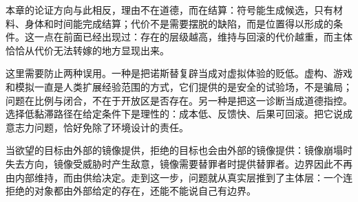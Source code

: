 本章的论证方向与此相反，理由不在道德，而在结算：符号能生成候选，只有材料、身体和时间能完成结算；代价不是需要摆脱的缺陷，而是位置得以形成的条件。这一点在前面已经出现过：存在的层级越高，维持与回滚的代价越重，而主体恰恰从代价无法转嫁的地方显现出来。

这里需要防止两种误用。一种是把诺斯替复辟当成对虚拟体验的贬低。虚构、游戏和模拟一直是人类扩展经验范围的方式，它们提供的是安全的试验场，不是骗局；问题在比例与闭合，不在于开放区是否存在。另一种是把这一诊断当成道德指控。选择低黏滞路径在给定条件下是理性的：成本低、反馈快、后果可回滚。把它说成意志力问题，恰好免除了环境设计的责任。

当欲望的目标由外部的镜像提供，拒绝的目标也会由外部的镜像提供：镜像崩塌时失去方向，镜像受威胁时产生敌意，镜像需要替罪者时提供替罪者。边界因此不再由内部维持，而由供给决定。走到这一步，问题就从真实层推到了主体层：一个连拒绝的对象都由外部给定的存在，还能不能说自己有边界。
